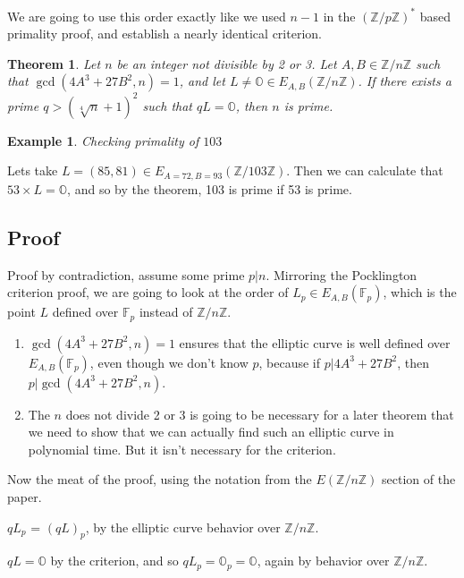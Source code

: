 \documentclass[]{article}
\newtheorem{theorem}{Theorem}
\newtheorem{benexample}{Example}
\newcommand{\Z}{\mathbb{Z}}
\newcommand{\OS}{\mathbb{O}}
\newcommand{\ZMZ}[1]{\Z/#1\Z}
\newcommand{\F}{\mathbb{F}}
\begin{document}
We are going to use this order exactly like we used $n-1$ in the $(\ZMZ{p})^*$ based primality proof, and establish a nearly identical criterion.

\noindent \begin{theorem} Let $n$ be an integer not divisible by 2 or 3. Let $A,B \in \ZMZ{n}$ such that $\gcd(4A^3+27B^2,n) = 1$, and let $L \ne \OS \in E_{A,B}(\ZMZ{n})$. If there exists a prime $q > (\sqrt[4]{n}+1)^2$ such that $qL = \OS$, then $n$ is prime.
\end{theorem}

\begin{tcolorbox}[breakable,
	enhanced,
	standard jigsaw,
	opacityback=0]	
	\noindent \begin{benexample}
		Checking primality of $103$
	\end{benexample}
	
	Lets take $L = (85,81) \in E_{A=72,B=93}(\ZMZ{103})$. Then we can calculate that $53\times L = \OS$, and so by the theorem, 103 is prime if 53 is prime. 
	
\end{tcolorbox}


\subsection{Proof}

Proof by contradiction, assume some prime $p | n$. Mirroring the Pocklington criterion proof, we are going to look at the order of $L_p \in E_{A,B}(\F_p)$, which is the point $L$ defined over $\F_p$ instead of $\ZMZ{n}$.


\begin{enumerate}
	\item   $\gcd(4A^3+27B^2,n) = 1$ ensures that the elliptic curve is well defined over $E_{A,B}(\F_p)$, even though we don't know $p$, because if $p | 4A^3+27B^2$, then $p | \gcd(4A^3+27B^2,n)$.
	\item The $n$ does not divide 2 or 3 is going to be necessary for a later theorem that we need to show that we can actually find such an elliptic curve in polynomial time. But it isn't necessary for the criterion.
\end{enumerate}

\noindent Now the meat of the proof, using the notation from the $E(\ZMZ{n})$ section of the paper.

\noindent $qL_p$ = $(qL)_p$, by the elliptic curve behavior over $\ZMZ{n}$.

\noindent $qL = \OS$ by the criterion, and so $qL_p = \OS_p = \OS$, again by behavior over $\ZMZ{n}$.
\end{document}

